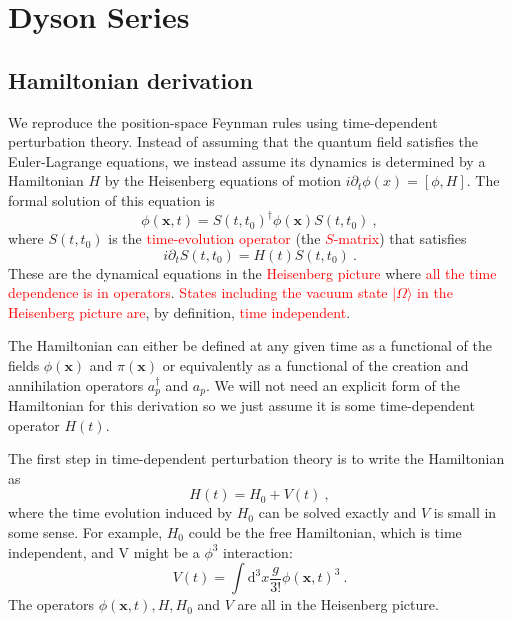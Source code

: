 \documentclass[11pt,a4paper]{article}
\renewcommand{\vec}[1]{\boldsymbol{#1}}
\newcommand{\dif}{\mathrm{d}}
\begin{document}
\section{Dyson Series}






\subsection{Hamiltonian derivation}
\cite{2014qfts.book.....S} We reproduce the position-space Feynman rules using time-dependent perturbation theory. Instead of assuming that the quantum field satisfies the Euler-Lagrange equations, we instead assume its dynamics is determined by a Hamiltonian $H$ by the Heisenberg equations of motion $i \partial_t \phi(x) = [\phi, H]$. The formal solution of this equation is
\begin{equation}
 \phi(\vec{x}, t) = S(t, t_0)^\dagger \phi(\vec{x}) S(t, t_0) ~,
\end{equation}
where $S(t, t_0)$ is the \textcolor{red}{time-evolution operator} (the \textcolor{red}{$S$-matrix}) that satisfies
\begin{equation}
i \partial_t S(t, t_0) = H(t) S(t, t_0) ~.
\end{equation}
These are the dynamical equations in the \textcolor{red}{Heisenberg picture} where \textcolor{red}{all the time dependence is in operators}. \textcolor{red}{States including the vacuum state $|\Omega \rangle$ in the Heisenberg picture are}, by definition, \textcolor{red}{time independent}.

The Hamiltonian can either be defined at any given time as a functional of the fields $\phi(\vec{x})$ and $\pi(\vec{x})$ or equivalently as a functional of the creation and annihilation operators $a^\dagger_p$ and $a_p$. We will not need an explicit form of the Hamiltonian for this derivation so we just assume it is some time-dependent operator $H(t)$.

The first step in time-dependent perturbation theory is to write the Hamiltonian as
\begin{equation}
H(t) = H_0 +V(t) ~,
\end{equation}
where the time evolution induced by $H_0$ can be solved exactly and $V$ is small in some sense. For example, $H_0$ could be the free Hamiltonian, which is time independent, and V might be a $\phi^3$ interaction:
\begin{equation}
V(t) = \int \dif^3 x \dfrac{g}{3!} \phi(\vec{x}, t)^3 ~.
\end{equation}
The operators $\phi(\vec{x}, t), H, H_0$ and $V$ are all in the Heisenberg picture.
\end{document}
